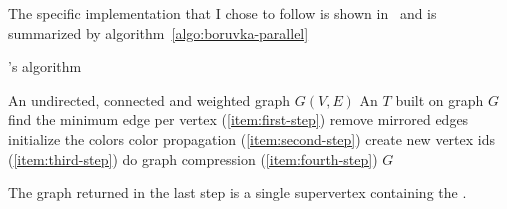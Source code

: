 \documentclass[a4paper,10pt]{article}
\begin{document}
The specific implementation that I chose to follow is shown in~\cite{generic-he-boruvka} and is summarized by algorithm~\ref{algo:boruvka-parallel}

\begin{algorithm}
	\caption{\brka's algorithm}\label{algo:boruvka-parallel}
	\begin{algorithmic}[1]
		\REQUIRE An undirected, connected and weighted graph $G(V, E)$
		\ENSURE An \mst$T$ built on graph $G$
			\STATE find the minimum edge per vertex (\ref{item:first-step})
			\STATE remove mirrored edges
			\STATE initialize the colors
				\STATE color propagation (\ref{item:second-step})
			\ENDWHILE
			\STATE create new vertex ids (\ref{item:third-step})
			\STATE do graph compression (\ref{item:fourth-step})
		\ENDWHILE
		\STATE\RETURN $G$
	\end{algorithmic}
\end{algorithm}

The graph returned in the last step is a single supervertex containing the \mst.
\end{document}
